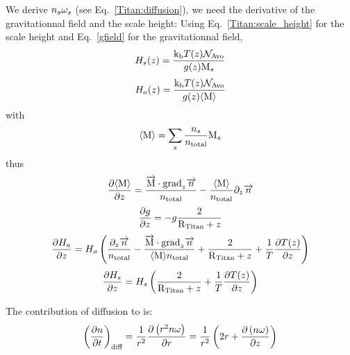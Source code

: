 We derive $n_s\omega_s$ (see Eq.~\ref{Titan:diffusion}),
we need the derivative of the gravitationnal field and the scale height:
Using Eq.~\ref{Titan:scale_height} for the scale height and Eq.~\ref{gfield}
for the gravitationnal field,
\begin{equation}
H_s(z) = \frac{\text{k}_\text{b} T(z) \mathcal{N}_\text{Avo}}{g(z)\text{M}_s}
\label{Titan:scale_height_spec}
\end{equation}
\begin{equation}
H_a(z) = \frac{\text{k}_\text{b} T(z) \mathcal{N}_\text{Avo}}{g(z)\langle\text{M}\rangle}
\label{Titan:scale_height_atm}
\end{equation}
with
\begin{equation}
\langle\text{M}\rangle = \sum_s \frac{n_s}{n_\text{total}} \text{M}_s
\end{equation}
thus
\begin{equation}
\frac{\partial\langle\text{M}\rangle}{\partial z} =   \frac{\overrightarrow{\text{M}}\cdot\text{grad}_{z}\overrightarrow{n}}{n_\text{total}}
                        - \frac{\langle\text{M}\rangle}{n_\text{total}}\partial_{z}{\overrightarrow{n}}
\end{equation}
\begin{equation}
\frac{\partial g}{\partial z} = -   g \frac{2}{\text{R}_\text{Titan} + z}
\end{equation}
\begin{equation}
\frac{\partial H_a}{\partial z} = H_a \left(\frac{\partial_{z}{\overrightarrow{n}}}{n_\text{total}}
                                - \frac{\overrightarrow{\text{M}}\cdot\text{grad}_{z}\overrightarrow{n}}{\langle\text{M}\rangle n_\text{total}}
                                + \frac{2}{\text{R}_\text{Titan} + z} 
                                + \frac{1}{T}\frac{\partial T(z)}{\partial z}\right)
\end{equation}
\begin{equation}
\frac{\partial H_s}{\partial z} = H_s\left(\frac{2}{\text{R}_\text{Titan} + z} + \frac{1}{T}\frac{\partial T(z)}{\partial z}\right) 
\end{equation}

The contribution of diffusion to  is:
\begin{equation}
\left(\frac{\partial n}{\partial t}\right)_{\text{diff}} = \frac{1}{r^2}\frac{\partial\left(r^2n\omega\right)}{\partial r}
                                             = \frac{1}{r^2}\left(2 r + \frac{\partial\left(n\omega\right)}{\partial z}\right)
\label{Titan:diffusion}
\end{equation}

